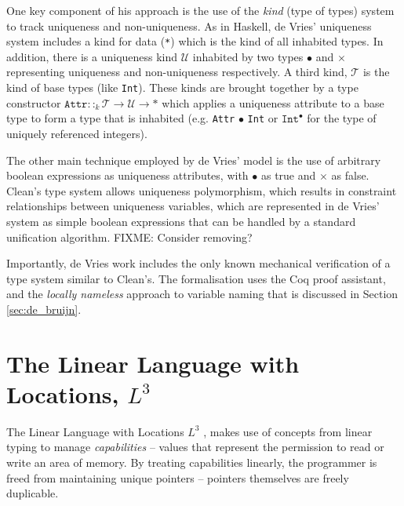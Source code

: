 \documentclass[]{unswthesis}
\begin{document}
One key component of his approach is the use of the \textit{kind} (type of types) system to track uniqueness and non-uniqueness. As in Haskell, de Vries' uniqueness system includes a kind for data (\texttt{*}) which is the kind of all inhabited types. In addition, there is a uniqueness kind $\mathcal{U}$ inhabited by two types $\bullet$ and $\times$ representing uniqueness and non-uniqueness respectively. A third kind, $\mathcal{T}$ is the kind of base types (like \texttt{Int}). These kinds are brought together by a type constructor $\texttt{Attr} ::_k \mathcal{T} \rightarrow \mathcal{U} \rightarrow *$ which applies a uniqueness attribute to a base type to form a type that is inhabited (e.g. \texttt{Attr} $\bullet$ \texttt{Int} or $\texttt{Int}^\bullet$ for the type of uniquely referenced integers).

The other main technique employed by de Vries' model is the use of arbitrary boolean expressions as uniqueness attributes, with $\bullet$ as true and $\times$ as false. Clean's type system allows uniqueness polymorphism, which results in constraint relationships between uniqueness variables, which are represented in de Vries' system as simple boolean expressions that can be handled by a standard unification algorithm. FIXME: Consider removing?

Importantly, de Vries work includes the only known mechanical verification of a type system similar to Clean's. The formalisation uses the Coq proof assistant, and the \textit{locally nameless} approach to variable naming that is discussed in Section \ref{sec:de_bruijn}.




\section{The Linear Language with Locations, $L^3$}

The Linear Language with Locations $L^3$ \cite{ahmed05}, makes use of concepts from linear typing to manage \textit{capabilities} -- values that represent the permission to read or write an area of memory. By treating capabilities linearly, the programmer is freed from maintaining unique pointers -- pointers themselves are freely duplicable.
\end{document}
